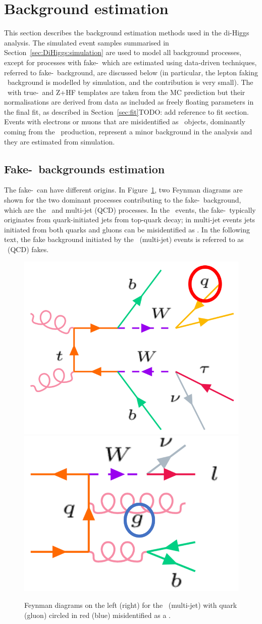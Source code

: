 \section{Background estimation}
\label{sec:DiHiggs:backgroundEstimation}
This section describes the background estimation methods used in the di-Higgs analysis. 
The simulated event samples summarised in Section~\ref{sec:DiHiggs:simulation}
are used to model all background processes, except for processes with fake-\tauhad\ 
which are estimated using data-driven techniques, referred to fake-\tauhad\ background,
are discussed below 
(in particular, the lepton faking \tauhad\ background is modelled by simulation, and 
the contribution is very small). 
The \ttbar\ with true-\tauhad\ and Z+HF templates are taken from the MC prediction
but their normalisations are derived from data 
as included as freely floating parameters in the final fit,
as described in Section~\ref{sec:fit}TODO: add reference to fit section. 
Events with electrons or muons that are misidentified as \tauhad\ objects, 
dominantly coming from the \ttbar\ production, 
represent a minor background in the analysis and they are estimated from simulation. 

\subsection{Fake-\tauhad\ backgrounds estimation}
\label{sec:DiHiggs:lephadfake}


The fake-\tauhad\ can have different origins. 
In Figure~\ref{fig:fakes:feynman}, two Feynman diagrams are shown
for the two dominant processes contributing to the fake-\tauhad\ background,
which are the \ttbar\ and multi-jet (QCD) processes. 
In the \ttbar\ events, the fake-\tauhad\ typically originates from quark-initiated jets from 
top-quark decay; in multi-jet events jets initiated from both quarks and gluons can be
misidentified as \tauhad. 
In the following text, the fake background initiated by the \ttbar\ (multi-jet) events is referred to as
\ttbar\ (QCD) fakes.
\begin{figure}[htbp]
\centering
\includegraphics[width=.33\textwidth]{DiHiggs/plots/feynman_ttbarfakes.png} \hspace{2cm}
\includegraphics[width=.33\textwidth]{DiHiggs/plots/feynman_QCDfakes.png}
\caption{
Feynman diagrams on the left (right) for the \ttbar\ (multi-jet) with quark (gluon) circled in
red (blue) misidentified as a \tauhad. 
}
\label{fig:fakes:feynman}
\end{figure} 


